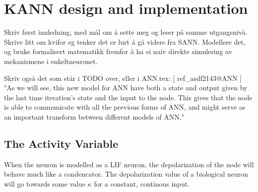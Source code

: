 
%



\section{KANN design and implementation}
\label{secKANN}
	

	Skriv først innledning, med mål om å sette meg og leser på samme utgangsnivå.
	Skrive litt om kvifor eg tenker det er lurt å gå videre fra SANN.
	Modellere det, og bruke formalisert matematikk fremfor å ha ei naiv direkte simulering av mekanismene i enkeltneuronet.

	Skriv også det som står i TODO over, eller i ANN.tex: [ ref\_asdf2143@ANN ]%
	"As we will see, this new model for ANN have both a state and output given by the last time iteration's state and the input to the node. 
	This gives that the node is able to communicate with all the previous forms of ANN, and might serve as an important transform between different models of ANN."

 		\subsection{The Activity Variable} %
	When the neuron is modelled as a LIF neuron, the depolarization of the node will behave much like a condencator. 
	The depolarization value of a biological neuron will go towards some value $\kappa$ for a constant, continous input.

